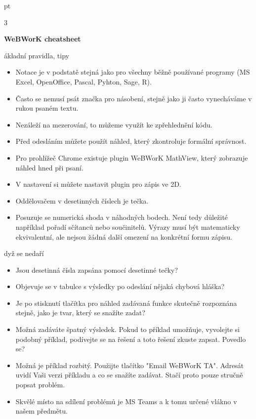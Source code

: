 \documentclass[10pt]{article}
\def\nadpis#1\par{\par\bigskip\noindent \textbf{#1} \par}
\begin{document}
 pt
\pagestyle{empty}

\setlength\columnsep{40pt}

\begin{multicols}3
  {\centering \textbf{WeBWorK cheatsheet}

    }

\nadpis Základní pravidla, tipy

\begin{itemize}
\itemsep=-3pt\raggedright
\item Notace je v podstatě stejná jako pro všechny běžně používané programy (MS Excel, OpenOffice, Pascal, Pyhton, Sage, R).
\item Často se nemusí psát značka pro násobení, stejně jako ji často vynecháváme v rukou psaném textu.
\item Nezáleží na mezerování, to můžeme využít ke zpřehlednění kódu.
\item Před odesláním můžete použít náhled, který zkontroluje formální správnost.
\item Pro prohlížeč Chrome existuje plugin WeBWorK MathView, který zobrazuje náhled hned při psaní.
\item V nastavení si můžete nastavit plugin pro zápis ve 2D.
\item Oddělovačem v desetinných číslech je tečka.
\item Posuzuje se numerická shoda v náhodných bodech. Není tedy důležité například pořadí sčítanců nebo součinitelů. Výrazy musí být matematicky ekvivalentní, ale nejsou žádná další omezení na konkrétní formu zápisu.
\end{itemize}

\nadpis Když se nedaří

\begin{itemize}  \itemsep=-3pt\raggedright
\item Jsou desetinná čísla zapsána pomocí desetinné tečky?
\item 
Objevuje se v tabulce s výsledky po odeslání nějaká chybová hláška?
\item 
Je po stisknutí tlačítka pro náhled zadávaná funkce skutečně rozpoznána stejně, jako je tvar, který se snažíte zadat?
\item 
Možná zadáváte špatný výsledek. Pokud to příklad umožňuje, vyvolejte si podobný příklad, podívejte se na řešení a toto řešení zkuste zapsat. Povedlo se?
\item 
Možná je příklad rozbitý. Použijte tlačítko "Email WeBWorK TA". Adresát uvidí Vaši verzi příkladu a co se snažíte zadávat. Stačí proto pouze stručně popsat problém.
\item Skvělé místo na sdílení problémů je MS Teams a k tomu určené vlákno v našem předmětu.
\end{itemize}
\vfill \null
\columnbreak


\end{multicols}
\end{document}
